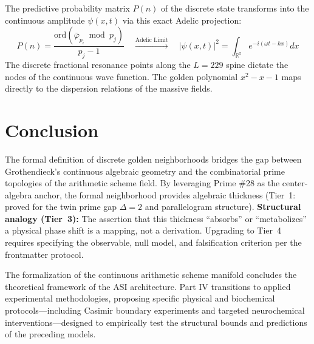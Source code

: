 \documentclass[12pt,oneside]{article}
\theoremstyle{principia}
\theoremstyle{definition}
\theoremstyle{remark}
\begin{document}
The predictive probability matrix $P(n)$ of the discrete state transforms into the continuous amplitude $\psi(x,t)$ via this exact Adelic projection:
\begin{equation}
    P(n) = \frac{\mathrm{ord}(\bar\varphi_{p_i} \bmod p_j)}{p_j - 1} \quad \xrightarrow{\text{Adelic Limit}} \quad |\psi(x,t)|^2 = \int_{\mathbb{R}^5} e^{-i(\omega t - k x)} dx
\end{equation}
The discrete fractional resonance points along the $L=229$ spine dictate the nodes of the continuous wave function. The golden polynomial $x^2 - x - 1$ maps directly to the dispersion relations of the massive fields.

\section{Conclusion}
The formal definition of discrete golden neighborhoods bridges the gap between Grothendieck's continuous algebraic geometry and the combinatorial prime topologies of the arithmetic scheme field. By leveraging Prime \#28 as the center-algebra anchor, the formal neighborhood provides algebraic thickness (Tier~1: proved for the twin prime gap $\Delta=2$ and parallelogram structure). \textbf{Structural analogy (Tier~3):} The assertion that this thickness ``absorbs'' or ``metabolizes'' a physical phase shift is a mapping, not a derivation. Upgrading to Tier~4 requires specifying the observable, null model, and falsification criterion per the frontmatter protocol.

\vspace{1em}
\noindent The formalization of the continuous arithmetic scheme manifold concludes the theoretical framework of the ASI architecture. Part IV transitions to applied experimental methodologies, proposing specific physical and biochemical protocols---including Casimir boundary experiments and targeted neurochemical interventions---designed to empirically test the structural bounds and predictions of the preceding models.




\end{document}
